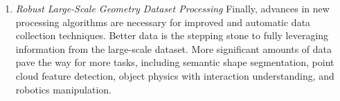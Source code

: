 \begin{enumerate}
\item \emph{Robust Large-Scale Geometry Dataset Processing}
Finally, advances in new processing algorithms are necessary for improved and automatic data collection techniques. 
Better data is the stepping stone to fully leveraging information from the large-scale dataset\cite{Koch_2019_CVPR,zhou2016thingi10k}. 
More significant amounts of data pave the way for more tasks, including semantic shape segmentation, point cloud feature detection, object physics with interaction understanding, and robotics manipulation.

\end{enumerate}

